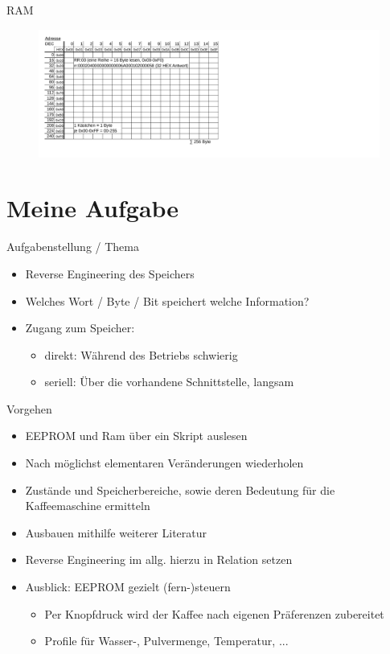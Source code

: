 \documentclass[
  de, %
  inputenc=utf8,
]{tuhhslides}
\begin{document}
\begin{frame}{RAM}
  \begin{figure}
    \begin{center}
      \hspace*{-1cm}
      \includegraphics[scale=0.46]{Material/Speicher-Schema-Jura-Ram}
    \end{center}
  \end{figure}
\end{frame}



\section{Meine Aufgabe}
\begin{frame}{Aufgabenstellung / Thema}
	\begin{itemize}
		\item Reverse Engineering des Speichers
		\item Welches Wort / Byte / Bit speichert welche Information?
		\item Zugang zum Speicher:
		\begin{itemize}
		  \item direkt: Während des Betriebs schwierig
		  \item seriell: Über die vorhandene Schnittstelle, langsam
		\end{itemize}
	\end{itemize}
\end{frame}

\begin{frame}{Vorgehen}
	\begin{itemize}
		\item EEPROM und Ram über ein Skript auslesen
		\item Nach möglichst elementaren Veränderungen wiederholen
		\item Zustände und Speicherbereiche, sowie deren Bedeutung für die Kaffeemaschine ermitteln
		\item Ausbauen mithilfe weiterer Literatur
		\item Reverse Engineering im allg. hierzu in Relation setzen
		\item Ausblick: EEPROM gezielt (fern-)steuern
		\begin{itemize}
		  \item Per Knopfdruck wird der Kaffee nach eigenen Präferenzen zubereitet
		  \item Profile für Wasser-, Pulvermenge, Temperatur, ...
		\end{itemize}
	\end{itemize}
\end{frame}
\end{document}
